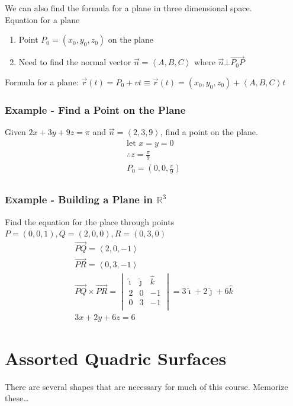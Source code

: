 \documentclass{article}
\newcommand{\nvec}[1]{\left\langle #1 \right\rangle}
\begin{document}
    We can also find the formula for a plane in three dimensional space.\\

    Equation for a plane
    \begin{enumerate}
    \item Point $P_0=(x_0,y_0,z_0)$ on the plane
    \item Need to find the normal vector $\vec{n}=\nvec{A,B,C}$ where $\vec{n}\bot\vec{P_0P}$
    \end{enumerate}
    Formula for a plane: $\vec{r}(t)=P_0+vt\equiv\vec{r}(t)=(x_0,y_0,z_0)+\nvec{A,B,C}t$

        \subsubsection{Example - Find a Point on the Plane}
        Given $2x+3y+9z=\pi$ and $\vec{n}=\nvec{2,3,9}$, find a point on the plane.
        \[
        \begin{aligned}
        \text{let }x=y=0\\
        \therefore z=\frac{\pi}{9}\\
        P_0=(0,0,\frac{\pi}{9})\\
        \end{aligned}
        \]

        \subsubsection{Example - Building a Plane in $\mathbb{R}^3$}
        Find the equation for the place through points $P=(0,0,1),Q=(2,0,0),R=(0,3,0)$
        \[
        \begin{aligned}
        \vec{PQ}=\nvec{2,0,-1}\\
        \vec{PR}=\nvec{0,3,-1}\\
        \vec{PQ}\times\vec{PR}=
            \begin{vmatrix}
                \hat{\imath} & \hat{\jmath} & \hat{k}\\
                2 & 0 & -1 \\
                0 & 3 & -1 \\
            \end{vmatrix}
        =3\hat{\imath} + 2\hat{\jmath} + 6\hat{k}\\
        3x+2y+6z=6
        \end{aligned}
        \]


\section{Assorted Quadric Surfaces}
    There are several shapes that are necessary for much of this course. Memorize these\dots
\end{document}
